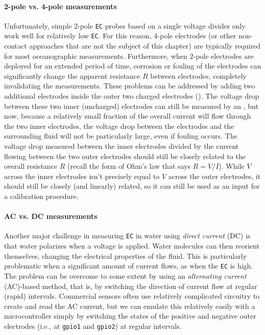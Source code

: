 \paragraph{2-pole vs. 4-pole measurements} Unfortunately, simple 2-pole \texttt{EC} probes based on a single voltage divider only work well for relatively low \texttt{EC}. For this reason, 4-pole electrodes (or other non-contact approaches that are not the subject of this chapter) are typically required for most oceanographic measurements. Furthermore, when 2-pole electrodes are deployed for an extended period of time, corrosion or fouling of the electrodes can significantly change the apparent resistance $R$ between electrodes, completely invalidating the measurements. These problems can be addressed by adding two additional electrodes inside the outer two charged electrodes (). The voltage drop between these two inner (uncharged) electrodes can still be measured by an \adc, but now, because a relatively small fraction of the overall current will flow through the two inner electrodes, the voltage drop between the electrodes and the surrounding fluid will not be particularly large, even if fouling occurs. The voltage drop measured between the inner electrodes divided by the current flowing between the two outer electrodes should still be closely related to the overall resistance $R$ (recall the form of Ohm's law that says $R = V/I$). While $V$ across the inner electrodes isn't precisely equal to $V$ across the outer electrodes, it should still be closely (and linearly) related, so it can still be used as an input for a calibration procedure.  

\paragraph{AC vs. DC measurements} Another major challenge in measuring \texttt{EC} in water using \emph{direct current} (DC) is that water polarizes when a voltage is applied. Water molecules can then reorient themselves, changing the electrical properties of the fluid. This is particularly problematic when a significant amount of current flows, as when the \texttt{EC} is high. The problem can be overcome to some extent by using an \emph{alternating current} (AC)-based method, that is, by switching the direction of current flow at regular (rapid) intervals.  Commercial sensors often use relatively complicated circuitry to create and read the AC current, but we can emulate this relatively easily with a microcontroller simply by switching the states of the positive and negative outer electrodes (i.e., at \texttt{gpio1} and \texttt{gpio2}) at regular intervals.

